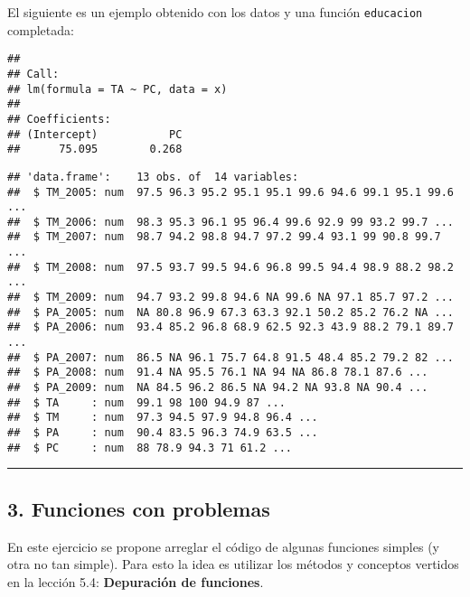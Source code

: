 \documentclass[]{article}
\newenvironment{Shaded}{}{}
\newcommand{\KeywordTok}[1]{\textcolor[rgb]{0.00,0.44,0.13}{\textbf{{#1}}}}
\newcommand{\StringTok}[1]{\textcolor[rgb]{0.25,0.44,0.63}{{#1}}}
\newcommand{\NormalTok}[1]{{#1}}
\begin{document}
El siguiente es un ejemplo obtenido con los datos y una función
\texttt{educacion} completada:

\begin{Shaded}
\end{Shaded}
\begin{verbatim}
## 
## Call:
## lm(formula = TA ~ PC, data = x)
## 
## Coefficients:
## (Intercept)           PC  
##      75.095        0.268
\end{verbatim}
\begin{Shaded}
\end{Shaded}
\begin{verbatim}
## 'data.frame':    13 obs. of  14 variables:
##  $ TM_2005: num  97.5 96.3 95.2 95.1 95.1 99.6 94.6 99.1 95.1 99.6 ...
##  $ TM_2006: num  98.3 95.3 96.1 95 96.4 99.6 92.9 99 93.2 99.7 ...
##  $ TM_2007: num  98.7 94.2 98.8 94.7 97.2 99.4 93.1 99 90.8 99.7 ...
##  $ TM_2008: num  97.5 93.7 99.5 94.6 96.8 99.5 94.4 98.9 88.2 98.2 ...
##  $ TM_2009: num  94.7 93.2 99.8 94.6 NA 99.6 NA 97.1 85.7 97.2 ...
##  $ PA_2005: num  NA 80.8 96.9 67.3 63.3 92.1 50.2 85.2 76.2 NA ...
##  $ PA_2006: num  93.4 85.2 96.8 68.9 62.5 92.3 43.9 88.2 79.1 89.7 ...
##  $ PA_2007: num  86.5 NA 96.1 75.7 64.8 91.5 48.4 85.2 79.2 82 ...
##  $ PA_2008: num  91.4 NA 95.5 76.1 NA 94 NA 86.8 78.1 87.6 ...
##  $ PA_2009: num  NA 84.5 96.2 86.5 NA 94.2 NA 93.8 NA 90.4 ...
##  $ TA     : num  99.1 98 100 94.9 87 ...
##  $ TM     : num  97.3 94.5 97.9 94.8 96.4 ...
##  $ PA     : num  90.4 83.5 96.3 74.9 63.5 ...
##  $ PC     : num  88 78.9 94.3 71 61.2 ...
\end{verbatim}
\begin{center}\rule{3in}{0.4pt}\end{center}

\subsection{3. Funciones con problemas}

En este ejercicio se propone arreglar el código de algunas funciones
simples (y otra no tan simple). Para esto la idea es utilizar los
métodos y conceptos vertidos en la lección 5.4: \textbf{Depuración de
funciones}.
\end{document}
